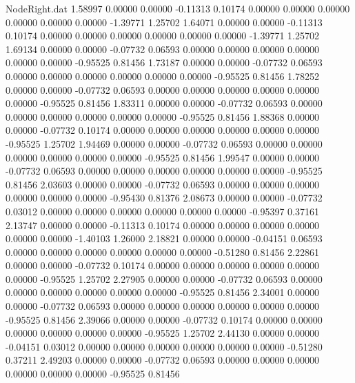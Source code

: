 \begin{filecontents}{NodeRight.dat}
   1.58997    0.00000    0.00000    -0.11313    0.10174    0.00000    0.00000    0.00000    0.00000    0.00000    0.00000   -1.39771    1.25702
   1.64071    0.00000    0.00000    -0.11313    0.10174    0.00000    0.00000    0.00000    0.00000    0.00000    0.00000   -1.39771    1.25702
   1.69134    0.00000    0.00000    -0.07732    0.06593    0.00000    0.00000    0.00000    0.00000    0.00000    0.00000   -0.95525    0.81456
   1.73187    0.00000    0.00000    -0.07732    0.06593    0.00000    0.00000    0.00000    0.00000    0.00000    0.00000   -0.95525    0.81456
   1.78252    0.00000    0.00000    -0.07732    0.06593    0.00000    0.00000    0.00000    0.00000    0.00000    0.00000   -0.95525    0.81456
   1.83311    0.00000    0.00000    -0.07732    0.06593    0.00000    0.00000    0.00000    0.00000    0.00000    0.00000   -0.95525    0.81456
   1.88368    0.00000    0.00000    -0.07732    0.10174    0.00000    0.00000    0.00000    0.00000    0.00000    0.00000   -0.95525    1.25702
   1.94469    0.00000    0.00000    -0.07732    0.06593    0.00000    0.00000    0.00000    0.00000    0.00000    0.00000   -0.95525    0.81456
   1.99547    0.00000    0.00000    -0.07732    0.06593    0.00000    0.00000    0.00000    0.00000    0.00000    0.00000   -0.95525    0.81456
   2.03603    0.00000    0.00000    -0.07732    0.06593    0.00000    0.00000    0.00000    0.00000    0.00000    0.00000   -0.95430    0.81376
   2.08673    0.00000    0.00000    -0.07732    0.03012    0.00000    0.00000    0.00000    0.00000    0.00000    0.00000   -0.95397    0.37161
   2.13747    0.00000    0.00000    -0.11313    0.10174    0.00000    0.00000    0.00000    0.00000    0.00000    0.00000   -1.40103    1.26000
   2.18821    0.00000    0.00000    -0.04151    0.06593    0.00000    0.00000    0.00000    0.00000    0.00000    0.00000   -0.51280    0.81456
   2.22861    0.00000    0.00000    -0.07732    0.10174    0.00000    0.00000    0.00000    0.00000    0.00000    0.00000   -0.95525    1.25702
   2.27905    0.00000    0.00000    -0.07732    0.06593    0.00000    0.00000    0.00000    0.00000    0.00000    0.00000   -0.95525    0.81456
   2.34001    0.00000    0.00000    -0.07732    0.06593    0.00000    0.00000    0.00000    0.00000    0.00000    0.00000   -0.95525    0.81456
   2.39066    0.00000    0.00000    -0.07732    0.10174    0.00000    0.00000    0.00000    0.00000    0.00000    0.00000   -0.95525    1.25702
   2.44130    0.00000    0.00000    -0.04151    0.03012    0.00000    0.00000    0.00000    0.00000    0.00000    0.00000   -0.51280    0.37211
   2.49203    0.00000    0.00000    -0.07732    0.06593    0.00000    0.00000    0.00000    0.00000    0.00000    0.00000   -0.95525    0.81456

\end{filecontents}

